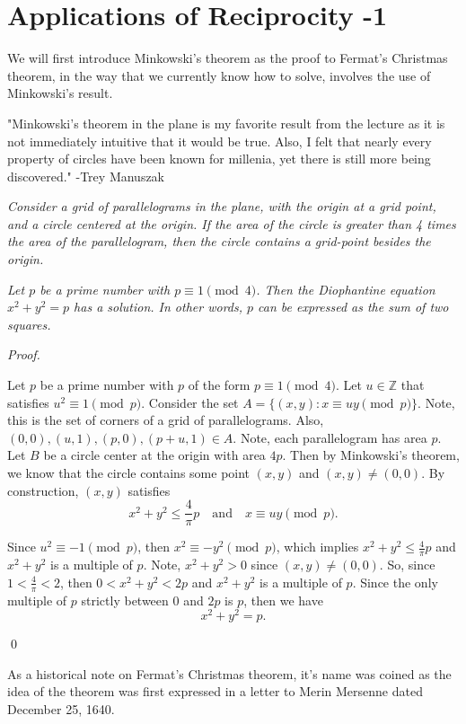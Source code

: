 \documentclass[12pt]{article}
\newenvironment{theorem}[2][Theorem]{\begin{trivlist}
\item[\hskip \labelsep {\bfseries #1}\hskip \labelsep {\bfseries #2}]}{\end{trivlist}}
\newenvironment{proposition}[2][Proposition]{\begin{trivlist}
\item[\hskip \labelsep {\bfseries #1}\hskip \labelsep {\bfseries #2}]}{\end{trivlist}}
\newenvironment{sol}
    {\emph{Proof.}
    }
    {
    \qed
    }
\begin{document}
\section{Applications of Reciprocity -1}

\hspace{1em} We will first introduce Minkowski's theorem as the proof to Fermat's Christmas theorem, in the way that we currently know how to solve, involves the use of Minkowski's result.

"Minkowski's theorem in the plane is my favorite result from the lecture as it is not immediately intuitive that it would be true. Also, I felt that nearly every property of circles have been known for millenia, yet there is still more being discovered." -Trey Manuszak

\begin{proposition}{8.8 (Minkowski's theorem in the plane)} \textit{Consider a grid of parallelograms in the plane, with the origin at a grid point, and a circle centered at the origin. If the area of the circle is greater than 4 times the area of the parallelogram, then the circle contains a grid-point besides the origin.}
\end{proposition}

\begin{theorem}{8.7 (Fermat's Christmas Theorem)}
  \textit{Let $p$ be a prime number with $p \equiv 1 \pmod{4}$. Then the Diophantine equation $x^2 + y^2 = p$ has a solution. In other words, $p$ can be expressed as the sum of two squares.}
\end{theorem}

\begin{sol}
  Let $p$ be a prime number with $p$ of the form $p \equiv 1 \pmod{4}$. Let $u \in \mathbb{Z}$ that satisfies $u^2 \equiv 1 \pmod{p}$. Consider the set $A = \{(x,y) : x \equiv uy \pmod{p}\}$. Note, this is the set of corners of a grid of parallelograms. Also, $(0,0),(u,1),(p,0),(p+u,1) \in A$. Note, each parallelogram has area $p$. Let $B$ be a circle center at the origin with area $4p$. Then by Minkowski's theorem, we know that the circle contains some point $(x,y)$ and $(x,y) \neq (0,0)$. By construction, $(x,y)$ satisfies $$x^2 + y^2 \leq \frac{4}{\pi}p \hspace{1em} \text{and} \hspace{1em} x \equiv uy \pmod{p}.$$

  \hspace{1em} Since $u^2 \equiv -1 \pmod{p}$, then $x^2 \equiv -y^2 \pmod{p}$, which implies $x^2 + y^2 \leq \frac{4}{\pi}p$ and $x^2 + y^2$ is a multiple of $p$. Note, $x^2 + y^2 > 0$ since $(x,y) \neq (0,0)$. So, since $1 < \frac{4}{\pi} < 2$, then $0 < x^2 + y^2 < 2p$ and $x^2 + y^2$ is a multiple of $p$. Since the only multiple of $p$ strictly between $0$ and $2p$ is $p$, then we have $$x^2 + y^2 = p.$$
\end{sol}

As a historical note on Fermat's Christmas theorem, it's name was coined as the idea of the theorem was first expressed in a letter to Merin Mersenne dated December 25, 1640.

\end{document}
